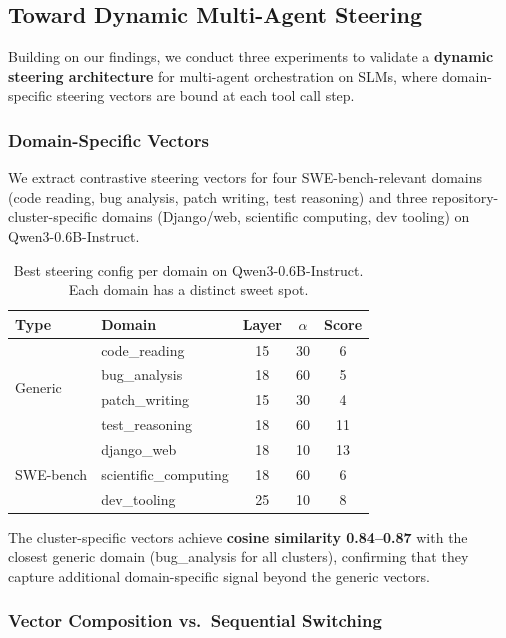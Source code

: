 \documentclass[11pt,a4paper]{article}
\begin{document}
\subsection{Toward Dynamic Multi-Agent Steering}
\label{sec:dynamic_steering}

Building on our findings, we conduct three experiments to validate a \textbf{dynamic steering architecture} for multi-agent orchestration on SLMs, where domain-specific steering vectors are bound at each tool call step.

\subsubsection{Domain-Specific Vectors}

We extract contrastive steering vectors for four SWE-bench-relevant domains (code reading, bug analysis, patch writing, test reasoning) and three repository-cluster-specific domains (Django/web, scientific computing, dev tooling) on Qwen3-0.6B-Instruct.

\begin{table}[H]
\centering
\caption{Best steering config per domain on Qwen3-0.6B-Instruct. Each domain has a distinct sweet spot.}
\label{tab:domain_configs}
\small
\begin{tabular}{llccc}
\toprule
\textbf{Type} & \textbf{Domain} & \textbf{Layer} & \textbf{$\alpha$} & \textbf{Score} \\
\midrule
\multirow{4}{*}{Generic} & code\_reading & 15 & 30 & 6 \\
& bug\_analysis & 18 & 60 & 5 \\
& patch\_writing & 15 & 30 & 4 \\
& test\_reasoning & 18 & 60 & 11 \\
\midrule
\multirow{3}{*}{SWE-bench} & django\_web & 18 & 10 & 13 \\
& scientific\_computing & 18 & 60 & 6 \\
& dev\_tooling & 25 & 10 & 8 \\
\bottomrule
\end{tabular}
\end{table}

The cluster-specific vectors achieve \textbf{cosine similarity 0.84--0.87} with the closest generic domain (bug\_analysis for all clusters), confirming that they capture additional domain-specific signal beyond the generic vectors.

\subsubsection{Vector Composition vs.\ Sequential Switching}
\end{document}
